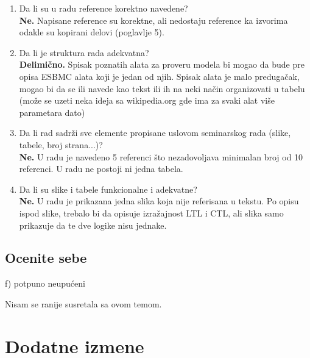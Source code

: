 \documentclass[a4paper]{report}
\begin{document}
\begin{enumerate}
\item Da li su u radu reference korektno navedene?\\

\textbf{Ne.} Napisane reference su korektne, ali nedostaju reference ka izvorima odakle su kopirani delovi (poglavlje 5).

\item Da li je struktura rada adekvatna?\\

\textbf{Delimično.} Spisak poznatih alata za proveru modela bi mogao da bude pre opisa ESBMC alata koji je jedan od njih. Spisak alata je malo predugačak, mogao bi da se ili navede kao tekst ili ih na neki način organizovati u tabelu (može se uzeti neka ideja sa wikipedia.org gde ima za svaki alat više parametara dato)

\item Da li rad sadrži sve elemente propisane uslovom seminarskog rada (slike, tabele, broj strana...)?\\

\textbf{Ne.} U radu je navedeno 5 referenci što nezadovoljava minimalan broj od 10 referenci. U radu ne postoji ni jedna tabela.

\item Da li su slike i tabele funkcionalne i adekvatne?\\

\textbf{Ne.} U radu je prikazana jedna slika koja nije referisana u tekstu. Po opisu ispod slike, trebalo bi da opisuje izražajnost LTL i CTL, ali slika samo prikazuje da te dve logike nisu jednake.
\end{enumerate}

\section{Ocenite sebe}
 f) potpuno neupućeni
 
 Nisam se ranije susretala sa ovom temom.



\chapter{Dodatne izmene}
\end{document}

